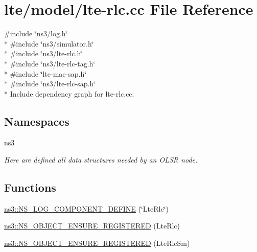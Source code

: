 \hypertarget{lte-rlc_8cc}{}\section{lte/model/lte-\/rlc.cc File Reference}
\label{lte-rlc_8cc}
{\ttfamily \#include \char`\"{}ns3/log.\+h\char`\"{}}\\*
{\ttfamily \#include \char`\"{}ns3/simulator.\+h\char`\"{}}\\*
{\ttfamily \#include \char`\"{}ns3/lte-\/rlc.\+h\char`\"{}}\\*
{\ttfamily \#include \char`\"{}ns3/lte-\/rlc-\/tag.\+h\char`\"{}}\\*
{\ttfamily \#include \char`\"{}lte-\/mac-\/sap.\+h\char`\"{}}\\*
{\ttfamily \#include \char`\"{}ns3/lte-\/rlc-\/sap.\+h\char`\"{}}\\*
Include dependency graph for lte-\/rlc.cc\+:
\subsection*{Namespaces}
\begin{DoxyCompactItemize}
\item 
 \hyperlink{namespacens3}{ns3}
\begin{DoxyCompactList}\small\item\em Here are defined all data structures needed by an O\+L\+SR node. \end{DoxyCompactList}\end{DoxyCompactItemize}
\subsection*{Functions}
\begin{DoxyCompactItemize}
\item 
\hyperlink{namespacens3_a17ea5ad374d242bae590cff24694de53}{ns3\+::\+N\+S\+\_\+\+L\+O\+G\+\_\+\+C\+O\+M\+P\+O\+N\+E\+N\+T\+\_\+\+D\+E\+F\+I\+NE} (\char`\"{}Lte\+Rlc\char`\"{})
\item 
\hyperlink{namespacens3_ae79458a32ca96a72b8cb8b59c17455f6}{ns3\+::\+N\+S\+\_\+\+O\+B\+J\+E\+C\+T\+\_\+\+E\+N\+S\+U\+R\+E\+\_\+\+R\+E\+G\+I\+S\+T\+E\+R\+ED} (Lte\+Rlc)
\item 
\hyperlink{namespacens3_a9c9d39a1b8cb5d8d815c9db19152e486}{ns3\+::\+N\+S\+\_\+\+O\+B\+J\+E\+C\+T\+\_\+\+E\+N\+S\+U\+R\+E\+\_\+\+R\+E\+G\+I\+S\+T\+E\+R\+ED} (Lte\+Rlc\+Sm)
\end{DoxyCompactItemize}
